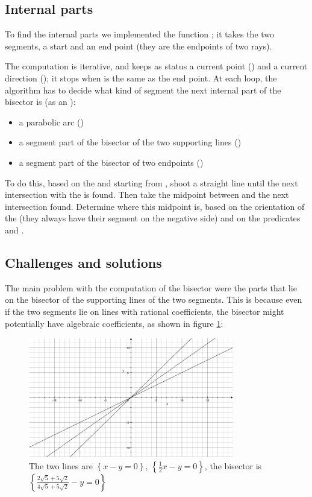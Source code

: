 \documentclass[11pt,a4paper,english]{article}
\begin{document}
	\subsection{Internal parts}
	To find the internal parts we implemented the function ; it takes the two segments, a start and an end point (they are the endpoints of two rays).\par
	The computation is iterative, and keeps as status a current point () and a current direction (); it stops when  is the same as the end point.
	At each loop, the algorithm has to decide what kind of segment the next internal part of the bisector is (as an ):
	\begin{itemize}[label=\(\triangleright\)]\setlength{\itemsep}{-2pt}
	\item a parabolic arc \hfill()
	\item a segment part of the bisector of the two supporting lines \hfill()
	\item a segment part of the bisector of two endpoints \hfill()
	\end{itemize}
	To do this, based on the  and starting from , shoot a straight line until the next intersection with the  is found. Then take the midpoint between  and the next intersection found. Determine where this midpoint is, based on the orientation of the  (they always have their segment on the negative side) and on the predicates  and .
	
	\subsection{Challenges and solutions}
	The main problem with the computation of the bisector were the parts that lie on the bisector of the supporting lines of the two segments. This is because even if the two segments lie on lines with rational coefficients, the bisector might potentially have algebraic coefficients, as shown in figure \ref{fig:algebraic_bisector}:
	\begin{figure}[h]
	\centering
	\includegraphics[width=0.8\textwidth]{algebraic_bisector}
	\caption{The two lines are \(\left\{x-y=0\right\}\), \(\left\{\frac{1}{2}x-y=0\right\}\), the bisector is \(\left\{\frac{2\sqrt{5}+5\sqrt{2}}{4\sqrt{5}+5\sqrt{2}}-y=0\right\}\) \label{fig:algebraic_bisector}}
	\end{figure}
\end{document}
